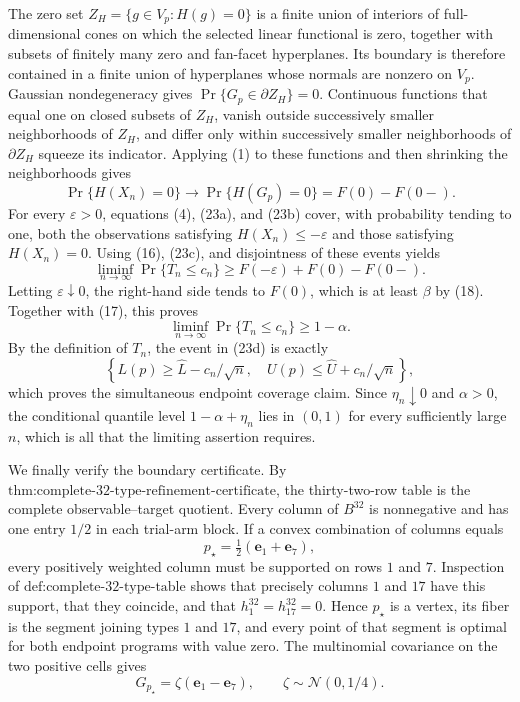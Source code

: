 The zero set \(Z_H=\{g\in V_p:H(g)=0\}\) is a finite union of interiors of full-dimensional cones on which the selected linear functional is zero, together with subsets of finitely many zero and fan-facet hyperplanes.  Its boundary is therefore contained in a finite union of hyperplanes whose normals are nonzero on \(V_p\).  Gaussian nondegeneracy gives \(\Pr\{G_p\in\partial Z_H\}=0\).  Continuous functions that equal one on closed subsets of \(Z_H\), vanish outside successively smaller neighborhoods of \(Z_H\), and differ only within successively smaller neighborhoods of \(\partial Z_H\) squeeze its indicator.  Applying (1) to these functions and then shrinking the neighborhoods gives
\[
\Pr\{H(X_n)=0\}\longrightarrow
\Pr\{H(G_p)=0\}=F(0)-F(0-).
\tag{23c}
\]
For every \(\varepsilon>0\), equations (4), (23a), and (23b) cover, with probability tending to one, both the observations satisfying \(H(X_n)\leq-\varepsilon\) and those satisfying \(H(X_n)=0\).  Using (16), (23c), and disjointness of these events yields
\[
\liminf_{n\to\infty}\Pr\{T_n\leq c_n\}
\geq F(-\varepsilon)+F(0)-F(0-).
\]
Letting \(\varepsilon\downarrow0\), the right-hand side tends to \(F(0)\), which is at least \(\beta\) by (18).  Together with (17), this proves
\[
\liminf_{n\to\infty}\Pr\{T_n\leq c_n\}\geq1-\alpha.
\tag{23d}
\]
By the definition of \(T_n\), the event in (23d) is exactly
\[
\left\{L(p)\geq\widehat L-c_n/\sqrt n,\quad
U(p)\leq\widehat U+c_n/\sqrt n\right\},
\]
which proves the simultaneous endpoint coverage claim.  Since \(\eta_n\downarrow0\) and \(\alpha>0\), the conditional quantile level \(1-\alpha+\eta_n\) lies in \((0,1)\) for every sufficiently large \(n\), which is all that the limiting assertion requires.

We finally verify the boundary certificate.  By \(\text{thm:complete-32-type-refinement-certificate}\), the thirty-two-row table is the complete observable--target quotient.  Every column of \(B^{32}\) is nonnegative and has one entry \(1/2\) in each trial-arm block.  If a convex combination of columns equals
\[
p_\star=\tfrac12(\mathbf e_1+\mathbf e_7),
\]
every positively weighted column must be supported on rows \(1\) and \(7\).  Inspection of \(\text{def:complete-32-type-table}\) shows that precisely columns \(1\) and \(17\) have this support, that they coincide, and that \(h^{32}_1=h^{32}_{17}=0\).  Hence \(p_\star\) is a vertex, its fiber is the segment joining types \(1\) and \(17\), and every point of that segment is optimal for both endpoint programs with value zero.  The multinomial covariance on the two positive cells gives
\[
G_{p_\star}=\zeta(\mathbf e_1-\mathbf e_7),
\qquad \zeta\sim\mathcal N(0,1/4).
\tag{24}
\]

